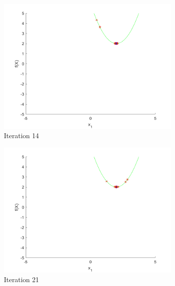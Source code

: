 \begin{figure}
\begin{subfigure}[b]{0.4\textwidth}
   \includegraphics[width=\textwidth]{img/smpl/circshft/loa-iter-14}
   \caption{Iteration 14}
   \label{fig:s8-iter-2}
 \end{subfigure}
 \begin{subfigure}[b]{0.4\textwidth}
   \includegraphics[width=\textwidth]{img/smpl/circshft/loa-iter-21}
   \caption{Iteration 21}
   \label{fig:s8-iter-3}
 \end{subfigure}
 \begin{subfigure}[b]{0.4\textwidth}

\end{subfigure}
\end{figure}
